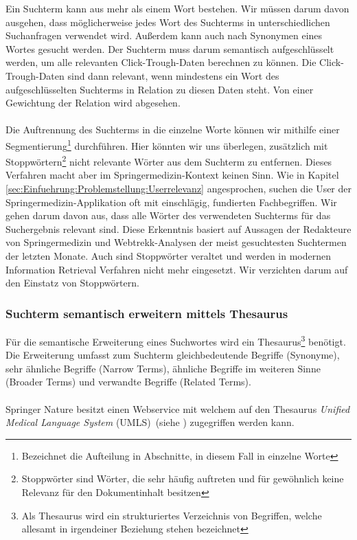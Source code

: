 Ein Suchterm kann aus mehr als einem Wort bestehen. Wir müssen darum davon ausgehen, dass möglicherweise jedes Wort des Suchterms in unterschiedlichen Suchanfragen verwendet wird. Außerdem kann auch nach Synonymen eines Wortes gesucht werden. Der Suchterm muss darum semantisch aufgeschlüsselt werden, um alle relevanten Click-Trough-Daten berechnen zu können. Die Click-Trough-Daten sind dann relevant, wenn mindestens ein Wort des aufgeschlüsselten Suchterms in Relation zu diesen Daten steht. Von einer Gewichtung der Relation wird abgesehen.
\\
\\
Die Auftrennung des Suchterms in die einzelne Worte können wir mithilfe einer Segmentierung\footnote{Bezeichnet die Aufteilung in Abschnitte, in diesem Fall in einzelne Worte} durchführen. Hier könnten wir uns überlegen, zusätzlich mit Stoppwörtern\footnote{Stoppwörter sind Wörter, die sehr häufig auftreten und für gewöhnlich keine Relevanz für den Dokumentinhalt besitzen} nicht relevante Wörter aus dem Suchterm zu entfernen. Dieses Verfahren macht aber im Springermedizin-Kontext keinen Sinn. Wie in Kapitel \ref{sec:Einfuehrung:Problemstellung:Userrelevanz} angesprochen, suchen die User der Springermedizin-Applikation oft mit einschlägig, fundierten Fachbegriffen. Wir gehen darum davon aus, dass alle Wörter des verwendeten Suchterms für das Suchergebnis relevant sind. Diese Erkenntnis basiert auf Aussagen der Redakteure von Springermedizin und Webtrekk-Analysen der meist gesuchtesten Suchtermen der letzten Monate. Auch sind Stoppwörter veraltet und werden in modernen Information Retrieval Verfahren nicht mehr eingesetzt. Wir verzichten darum auf den Einstatz von Stoppwörtern.

\subsubsection{Suchterm semantisch erweitern mittels Thesaurus}
\label{sec:Reranking:Methodik:SuchtermSegmentierung:SuchtermThesaurus}

Für die semantische Erweiterung eines Suchwortes wird ein Thesaurus\footnote{Als Thesaurus wird ein strukturiertes Verzeichnis von Begriffen, welche allesamt in irgendeiner Beziehung stehen bezeichnet} benötigt. Die Erweiterung umfasst zum Suchterm gleichbedeutende Begriffe (Synonyme), sehr ähnliche Begriffe (Narrow Terms), ähnliche Begriffe im weiteren Sinne (Broader Terms) und verwandte Begriffe (Related Terms).
\\
\\
Springer Nature besitzt einen Webservice mit welchem auf den Thesaurus \textit{Unified Medical Language System} (UMLS)~(siehe \cite{UMLS}) zugegriffen werden kann. 

